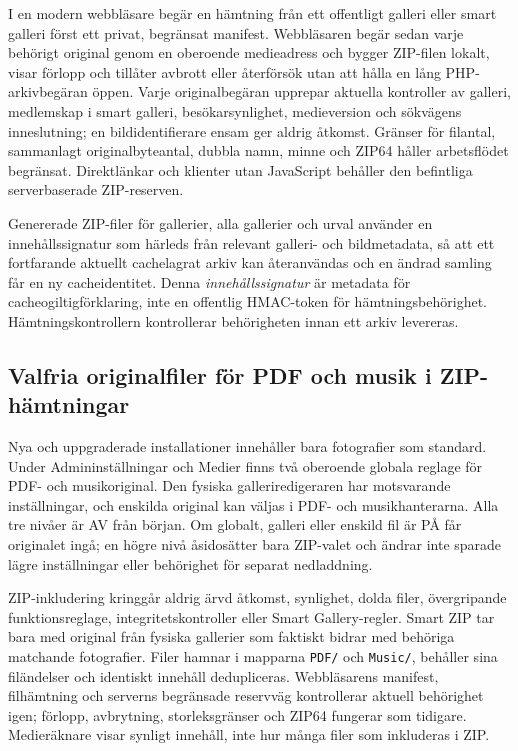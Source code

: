 \documentclass[11pt,a4paper]{article}
\begin{document}
I en modern webbläsare begär en hämtning från ett offentligt galleri eller smart
galleri först ett privat, begränsat manifest. Webbläsaren begär sedan varje
behörigt original genom en oberoende medieadress och bygger ZIP-filen lokalt,
visar förlopp och tillåter avbrott eller återförsök utan att hålla en lång
PHP-arkivbegäran öppen. Varje originalbegäran upprepar aktuella kontroller av
galleri, medlemskap i smart galleri, besökarsynlighet, medieversion och
sökvägens inneslutning; en bildidentifierare ensam ger aldrig åtkomst. Gränser
för filantal, sammanlagt originalbyteantal, dubbla namn, minne och ZIP64 håller
arbetsflödet begränsat. Direktlänkar och klienter utan JavaScript behåller den
befintliga serverbaserade ZIP-reserven.

Genererade ZIP-filer för gallerier, alla gallerier och urval använder en
innehållssignatur som härleds från relevant galleri- och bildmetadata, så att
ett fortfarande aktuellt cachelagrat arkiv kan återanvändas och en ändrad
samling får en ny cacheidentitet. Denna \emph{innehållssignatur} är metadata för
cacheogiltigförklaring, inte en offentlig HMAC-token för hämtningsbehörighet.
Hämtningskontrollern kontrollerar behörigheten innan ett arkiv levereras.

\subsection{Valfria originalfiler för PDF och musik i ZIP-hämtningar}
Nya och uppgraderade installationer innehåller bara fotografier som standard.
Under Admininställningar och Medier finns två oberoende globala reglage för PDF-
och musikoriginal. Den fysiska galleriredigeraren har motsvarande inställningar,
och enskilda original kan väljas i PDF- och musikhanterarna. Alla tre nivåer är
AV från början. Om globalt, galleri eller enskild fil är PÅ får originalet ingå;
en högre nivå åsidosätter bara ZIP-valet och ändrar inte sparade lägre
inställningar eller behörighet för separat nedladdning.

ZIP-inkludering kringgår aldrig ärvd åtkomst, synlighet, dolda filer,
övergripande funktionsreglage, integritetskontroller eller Smart Gallery-regler.
Smart ZIP tar bara med original från fysiska gallerier som faktiskt bidrar med
behöriga matchande fotografier. Filer hamnar i mapparna \texttt{PDF/} och
\texttt{Music/}, behåller sina filändelser och identiskt innehåll dedupliceras.
Webbläsarens manifest, filhämtning och serverns begränsade reservväg
kontrollerar aktuell behörighet igen; förlopp, avbrytning, storleksgränser och
ZIP64 fungerar som tidigare. Medieräknare visar synligt innehåll, inte hur många
filer som inkluderas i ZIP.
\end{document}
